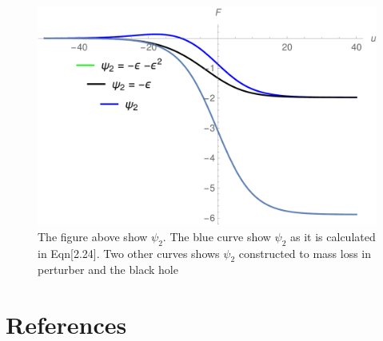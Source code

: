 \documentclass[prd,preprintnumbers,onecolumn,eqsecnum,floatfix,letter]{revtex4}
\begin{document}
\begin{figure}
	\includegraphics[width=5.5in]{../plots/BalanceLawTwosides.pdf}
	\caption{The figure above show $\psi_2$. The blue curve show $\psi_2$ as it is calculated in Eqn[2.24]. Two other curves shows $\psi_2$ constructed to mass loss in perturber and the black hole }
	\label{fig:RHSvsLHS}
\end{figure}
\section*{References}



\end{document}
